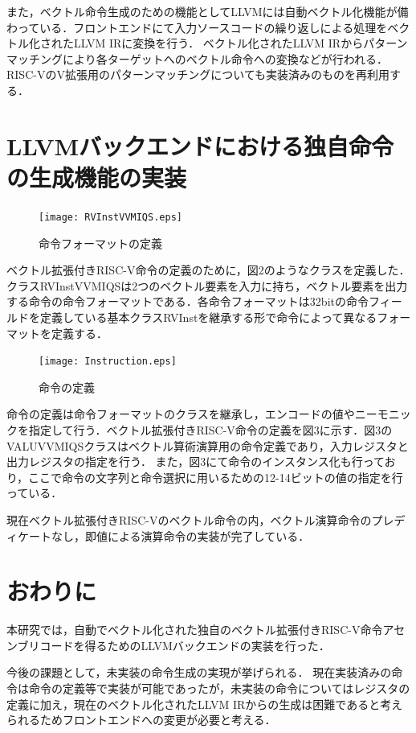 \documentclass[a4paper,9pt, twocolumn]{jarticle}
\begin{document}
また，ベクトル命令生成のための機能としてLLVMには自動ベクトル化機能が備わっている．フロントエンドにて入力ソースコードの繰り返しによる処理をベクトル化されたLLVM IRに変換を行う．
ベクトル化されたLLVM IRからパターンマッチングにより各ターゲットへのベクトル命令への変換などが行われる．RISC-VのV拡張用のパターンマッチングについても実装済みのものを再利用する．

\section{LLVMバックエンドにおける独自命令の生成機能の実装}

\begin{figure}[H]
    \centering
        \texttt{[image: RVInstVVMIQS.eps]}
    \caption{命令フォーマットの定義}
    \label{fig:Instruciton_format}
\end{figure}

ベクトル拡張付きRISC-V命令の定義のために，図2のようなクラスを定義した．クラスRVInstVVMIQSは2つのベクトル要素を入力に持ち，ベクトル要素を出力する命令の命令フォーマットである．各命令フォーマットは32bitの命令フィールドを定義している基本クラスRVInstを継承する形で命令によって異なるフォーマットを定義する．

\begin{figure}[H]
    \centering
        \texttt{[image: Instruction.eps]}
    \caption{命令の定義}
    \label{fig:Instruciton}
\end{figure}

命令の定義は命令フォーマットのクラスを継承し，エンコードの値やニーモニックを指定して行う．ベクトル拡張付きRISC-V命令の定義を図3に示す．図3のVALUVVMIQSクラスはベクトル算術演算用の命令定義であり，入力レジスタと出力レジスタの指定を行う．
また，図3にて命令のインスタンス化も行っており，ここで命令の文字列と命令選択に用いるための12-14ビットの値の指定を行っている．

現在ベクトル拡張付きRISC-Vのベクトル命令の内，ベクトル演算命令のプレディケートなし，即値による演算命令の実装が完了している．

\section{おわりに}
本研究では，自動でベクトル化された独自のベクトル拡張付きRISC-V命令アセンブリコードを得るためのLLVMバックエンドの実装を行った．

今後の課題として，未実装の命令生成の実現が挙げられる．
現在実装済みの命令は命令の定義等で実装が可能であったが，未実装の命令についてはレジスタの定義に加え，現在のベクトル化されたLLVM IRからの生成は困難であると考えられるためフロントエンドへの変更が必要と考える．
\end{document}
